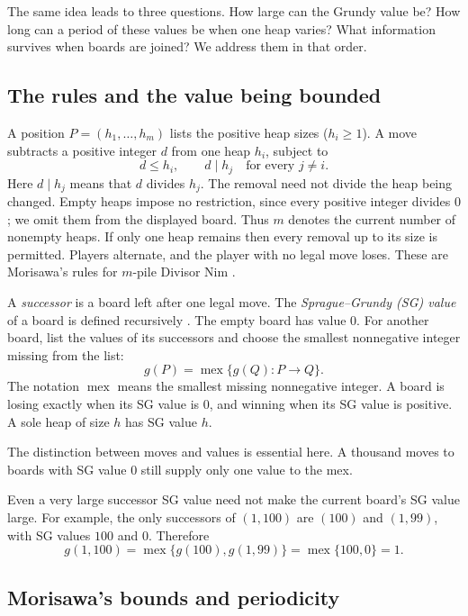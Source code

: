 \documentclass[11pt]{article}
\DeclareMathOperator{\mex}{mex}
\begin{document}
The same idea leads to three questions. How large can the Grundy
value be? How long can a period of these values be when one heap
varies? What information survives when boards are joined? We address
them in that order.

\subsection{The rules and the value being bounded}

A position $P=(h_1,\ldots,h_m)$ lists the positive heap sizes ($h_i \ge 1$).
A move subtracts a positive integer $d$ from one heap $h_i$, subject to
\begin{equation}
 d\le h_i,\qquad d\mid h_j\quad\text{for every }j\ne i.
 \label{eq:rule}
\end{equation}
Here $d\mid h_j$ means that $d$ divides $h_j$. The removal need not
divide the heap being changed. Empty heaps impose no restriction,
since every positive integer divides $0$; we omit them from the displayed
board. Thus $m$ denotes the current number of nonempty heaps.
If only one heap remains then every removal up to its size is permitted.
Players alternate, and the player with no legal move loses.
These are Morisawa's rules for $m$-pile Divisor Nim
\cite{Morisawa2026}.

A \emph{successor} is a board left after one legal move.
The \emph{Sprague--Grundy (SG) value} of a board is defined recursively
\cite{Siegel2013}. The empty board has value $0$. For another board, list the values of its successors and choose the smallest nonnegative integer missing from the list:
\begin{equation}
 g(P)=\mex\{g(Q):P\longrightarrow Q\}.
 \label{eq:mex}
\end{equation}
The notation $\mex$ means the smallest missing nonnegative integer.
A board is losing exactly when its SG value is $0$, and winning
when its SG value is positive. A sole heap of size $h$ has
SG value $h$.

The distinction between moves and values is essential here.
A thousand moves to boards with SG value $0$ still supply only
one value to the mex.

Even a very large successor SG value need not make the current
board's SG value large. For example, the only successors of
$(1,100)$ are $(100)$ and $(1,99)$, with SG values $100$ and $0$.
Therefore
\[
 g(1,100)
 =\mex\{g(100),g(1,99)\}
 =\mex\{100,0\}
 =1.
\]

\subsection{Morisawa's bounds and periodicity}
\end{document}
